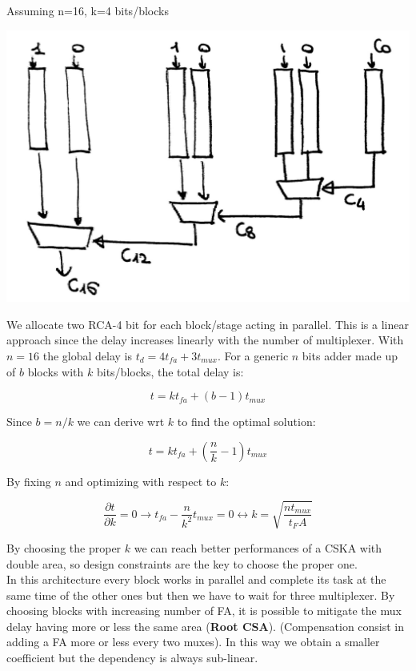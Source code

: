 Assuming n=16, k=4 bits/blocks

\begin{center}
  \includegraphics[width=0.7\linewidth]{img/img2/8}
\end{center}

 We allocate two RCA-4 bit for each block/stage acting in parallel. This is a
 linear approach since the delay increases linearly with the number of
 multiplexer. With $n=16$ the global delay is $t_d=4t_{fa}+3t_{mux}$. For a
 generic $n$ bits adder made up of $b$ blocks with $k$ bits/blocks, the total
 delay is:

 $$t=kt_{fa}+(b-1)t_{mux}$$

Since $b=n/k$ we can derive wrt $k$ to find the optimal solution:

$$t=kt_{fa}+(\frac{n}{k}-1)t_{mux}$$

By fixing $n$ and optimizing with respect to $k$:

$$ \frac{\partial t}{\partial k} = 0 \longrightarrow  t_{fa}-
\frac{n}{k^2} t_{mux}=0 \longleftrightarrow k=\sqrt{\frac{nt_{mux}}{t_FA}} $$

By choosing the proper $k$ we can reach better performances of a CSKA with
double area, so design constraints are the key to choose the proper one.\\

In this architecture every block works in parallel and complete its task at
the same time of the other ones but then we have to wait for three multiplexer.
By choosing blocks with increasing number of FA, it is possible to mitigate the 
mux delay having more or less the same area (\textbf{Root CSA}). (Compensation 
consist in adding a FA more or less every two muxes).
In this way we obtain a smaller coefficient but the dependency
is always sub-linear.


